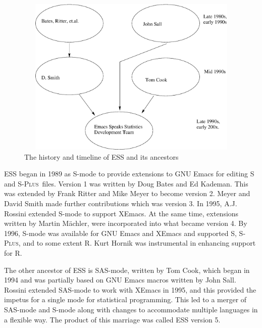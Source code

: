 \documentclass{article}
\newif\ifdraft
\newcommand*{\Splus}{\textsc{S-Plus}}
\newcommand{\stexttt}[1]{{\small\texttt{#1}}}
\newcommand{\emptyfig}{
\hspace*{42pt}\rule{324pt}{.25pt}\\
\hspace*{42pt}\rule{.25pt}{10pc}
\rule{316pt}{.25pt}
\rule{.25pt}{10pc}}
\begin{document}
\begin{figure}[tbp]
  \centering
\ifdraft
  \emptyfig
\else
  \includegraphics[height=3in,width=5.5in]{timeline} %
\fi
  \caption{The history and timeline of ESS and its ancestors}
  \label{fig:history}
\end{figure}


ESS began in 1989 as S-mode to provide extensions to GNU Emacs for
editing S and \Splus\ files.  Version 1 was written by Doug Bates and
Ed Kademan.  This was extended by Frank Ritter and Mike Meyer to
become version 2.  Meyer and David Smith made further contributions
which was version 3.
In 1995, A.J. Rossini extended S-mode to support XEmacs.  At the same
time, extensions written by Martin M{\"a}chler, were incorporated into
what became version 4.  By 1996, S-mode was available for GNU Emacs
and XEmacs and supported S, \Splus, and to some extent R.  Kurt Hornik
was instrumental in enhancing support for R.

The other ancestor of ESS is SAS-mode, written by Tom Cook, which
began in 1994 and was partially based on GNU Emacs macros written by
John Sall.
Rossini extended SAS-mode to work with XEmacs in 1995, and this provided the
impetus for a single mode for statistical programming.
This led to a merger of SAS-mode and S-mode along with changes
to accommodate multiple languages in a flexible way.  The product of this
marriage was called ESS version 5.
\end{document}
